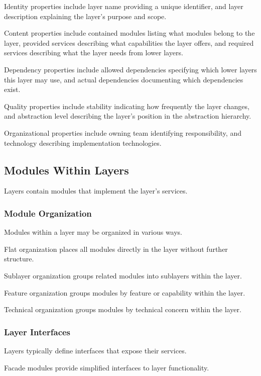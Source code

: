 \documentclass[11pt]{article}
\begin{document}
Identity properties include layer name providing a unique identifier, and layer description explaining the layer's purpose and scope.

Content properties include contained modules listing what modules belong to the layer, provided services describing what capabilities the layer offers, and required services describing what the layer needs from lower layers.

Dependency properties include allowed dependencies specifying which lower layers this layer may use, and actual dependencies documenting which dependencies exist.

Quality properties include stability indicating how frequently the layer changes, and abstraction level describing the layer's position in the abstraction hierarchy.

Organizational properties include owning team identifying responsibility, and technology describing implementation technologies.

\subsection{Modules Within Layers}

Layers contain modules that implement the layer's services.

\subsubsection{Module Organization}

Modules within a layer may be organized in various ways.

Flat organization places all modules directly in the layer without further structure.

Sublayer organization groups related modules into sublayers within the layer.

Feature organization groups modules by feature or capability within the layer.

Technical organization groups modules by technical concern within the layer.

\subsubsection{Layer Interfaces}

Layers typically define interfaces that expose their services.

Facade modules provide simplified interfaces to layer functionality.
\end{document}
